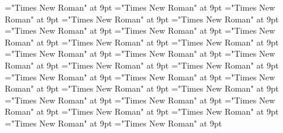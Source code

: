 \documentclass[gps1,twoside]{article}
\begin{document}
\font\scientificnamesensesensesentryafter="Times New Roman" at 9pt
\font\semanticdomainsemanticdomainsemanticdomainssensesensesentrybefore="Times New Roman" at 9pt
\font\semanticdomainssensesensesentrybefore="Times New Roman" at 9pt
\font\semanticdomainssensesensesentryafter="Times New Roman" at 9pt
\font\spanspanabbreviationsemanticdomainsemanticdomainssensesensesentrybefore="Times New Roman" at 9pt
\font\spanabbreviationsemanticdomainsemanticdomainssensesensesentrylastchildafter="Times New Roman" at 9pt
\font\spanspannamesemanticdomainsemanticdomainssensesensesentrybefore="Times New Roman" at 9pt
\font\academicdomainacademicdomainacademicdomainssensesensesentrybefore="Times New Roman" at 9pt
\font\academicdomainssensesensesentrybefore="Times New Roman" at 9pt
\font\academicdomainssensesensesentryafter="Times New Roman" at 9pt
\font\spanspanabbreviationacademicdomainacademicdomainssensesensesentrybefore="Times New Roman" at 9pt
\font\spanspannameacademicdomainacademicdomainssensesensesentrybefore="Times New Roman" at 9pt
\font\spannameacademicdomainacademicdomainssensesensesentryfirstchildbefore="Times New Roman" at 9pt
\font\spannameacademicdomainacademicdomainssensesensesentrylastchildafter="Times New Roman" at 9pt
\font\usageusageusagessensesensesentrybefore="Times New Roman" at 9pt
\font\usagessensesensesentrybefore="Times New Roman" at 9pt
\font\usagessensesensesentryafter="Times New Roman" at 9pt
\font\spanspanabbreviationusageusagessensesensesentrybefore="Times New Roman" at 9pt
\font\complexformsnotsubentrycomplexformsnotsubentrycomplexformsnotsubentriessensesensesentrybefore="Times New Roman" at 9pt
\font\complexformsnotsubentriessensesensesentryafter="Times New Roman" at 9pt
\font\complexformtypescomplexformsnotsubentrycomplexformsnotsubentriessensesensesentryafter="Times New Roman" at 9pt
\font\spanspanreverseabbrcomplexformtypecomplexformtypescomplexformsnotsubentrycomplexformsnotsubentriessensesensesentrybefore="Times New Roman" at 9pt
\font\spanspanheadwordcomplexformsnotsubentrycomplexformsnotsubentriessensesensesentrybefore="Times New Roman" at 9pt
\font\spanspanowningentrysummarydefinitioncomplexformsnotsubentrycomplexformsnotsubentriessensesensesentrybefore="Times New Roman" at 9pt
\font\spanowningentrysummarydefinitioncomplexformsnotsubentrycomplexformsnotsubentriessensesensesentryfirstchildbefore="Times New Roman" at 9pt
\font\spanowningentrysummarydefinitioncomplexformsnotsubentrycomplexformsnotsubentriessensesensesentrylastchildafter="Times New Roman" at 9pt
\font\nontrivialentryrootnontrivialentryrootnontrivialentryrootscomplexformsnotsubentrycomplexformsnotsubentriessensesensesentrybefore="Times New Roman" at 9pt
\end{document}
